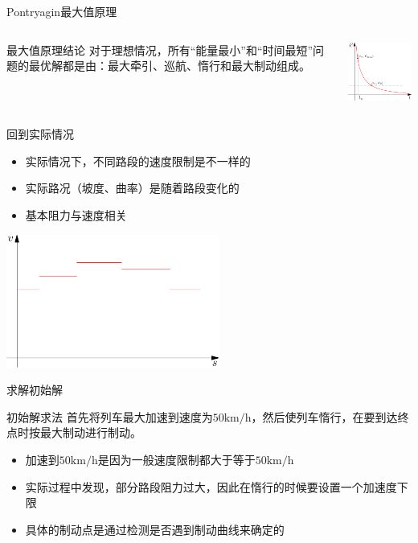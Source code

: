 \documentclass{beamer}
\begin{document}
\begin{frame}{Pontryagin最大值原理}
\begin{columns}[c]
\column{8cm}

\begin{block}{最大值原理结论}
对于理想情况，所有“能量最小”和“时间最短”问题的最优解都是由：最大牵引、巡航、惰行和最大制动组成。
\end{block}

\column{4.2cm} \includegraphics[width=4cm]{fig/fig2/fig2.pdf}
\end{columns}
\end{frame}

\begin{frame}{回到实际情况}
\begin{itemize}
  \item 实际情况下，不同路段的速度限制是不一样的
  \item 实际路况（坡度、曲率）是随着路段变化的
  \item 基本阻力与速度相关
\end{itemize}
\begin{center}
\includegraphics[width=7cm]{fig/fig5/fig5.pdf}
\end{center}
\end{frame}

\begin{frame}{求解初始解}
\begin{block}{初始解求法}
首先将列车最大加速到速度为$50 \mathrm{km/h}$，然后使列车惰行，在要到达终点时按最大制动进行制动。
\end{block}
\begin{itemize}
  \item 加速到$50 \mathrm{km/h}$是因为一般速度限制都大于等于$50 \mathrm{km/h}$
  \item 实际过程中发现，部分路段阻力过大，因此在惰行的时候要设置一个加速度下限
  \item 具体的制动点是通过检测是否遇到制动曲线来确定的
\end{itemize}
\end{frame}
\end{document}

